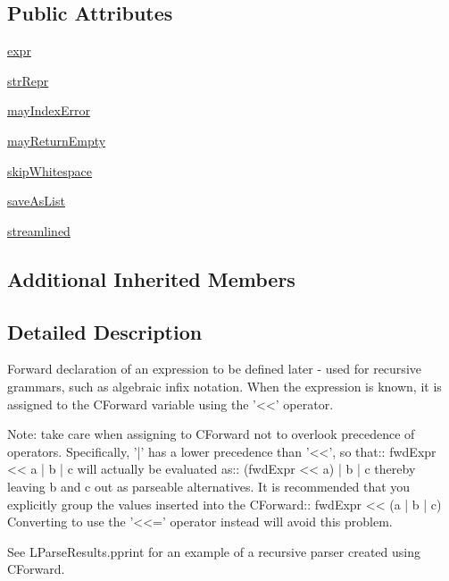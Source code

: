 \subsection*{Public Attributes}
\begin{DoxyCompactItemize}
\item 
\hyperlink{classpkg__resources_1_1__vendor_1_1pyparsing_1_1Forward_acd61b467cb4c3cfacdf3a20964831388}{expr}
\item 
\hyperlink{classpkg__resources_1_1__vendor_1_1pyparsing_1_1Forward_aac0be0b8632e775a8468c4a8a4a03c79}{str\+Repr}
\item 
\hyperlink{classpkg__resources_1_1__vendor_1_1pyparsing_1_1Forward_a160e4d1d6951b732afab277a35cc57a0}{may\+Index\+Error}
\item 
\hyperlink{classpkg__resources_1_1__vendor_1_1pyparsing_1_1Forward_acf15de1fff6edfeecd33f09dd9e36f95}{may\+Return\+Empty}
\item 
\hyperlink{classpkg__resources_1_1__vendor_1_1pyparsing_1_1Forward_a5c1806cd2166281af7109feaf60d5e62}{skip\+Whitespace}
\item 
\hyperlink{classpkg__resources_1_1__vendor_1_1pyparsing_1_1Forward_a88ce4f7535ac188a6cac66837217d908}{save\+As\+List}
\item 
\hyperlink{classpkg__resources_1_1__vendor_1_1pyparsing_1_1Forward_a428d754593cf9ba57429f411a6e92a6f}{streamlined}
\end{DoxyCompactItemize}
\subsection*{Additional Inherited Members}


\subsection{Detailed Description}
\begin{DoxyVerb}Forward declaration of an expression to be defined later -
used for recursive grammars, such as algebraic infix notation.
When the expression is known, it is assigned to the C{Forward} variable using the '<<' operator.

Note: take care when assigning to C{Forward} not to overlook precedence of operators.
Specifically, '|' has a lower precedence than '<<', so that::
    fwdExpr << a | b | c
will actually be evaluated as::
    (fwdExpr << a) | b | c
thereby leaving b and c out as parseable alternatives.  It is recommended that you
explicitly group the values inserted into the C{Forward}::
    fwdExpr << (a | b | c)
Converting to use the '<<=' operator instead will avoid this problem.

See L{ParseResults.pprint} for an example of a recursive parser created using
C{Forward}.
\end{DoxyVerb}
 

